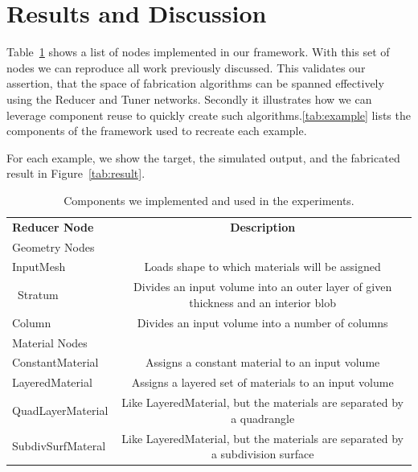 \documentclass[annual]{acmsiggraph}
\newcommand{\note}[1]{\marginpar{\LARGE $\spadesuit$}
			$\spadesuit$ {\bf #1} $\spadesuit$}
\begin{document}
%
%
%
%

\section{Results and Discussion}
Table~\ref{tab:built-in} shows a list of nodes implemented in our framework. With this set of nodes we can reproduce all work previously discussed. This validates our assertion, that the space of fabrication  algorithms can be spanned effectively using the Reducer and Tuner networks. Secondly it illustrates how we can leverage component reuse to quickly create such algorithms.\autoref{tab:example} lists the components of the framework used to recreate each example.

For each example, we show the target, the simulated output, and the fabricated result in Figure~\ref{tab:result}.


\begin{table}
\centering
\begin{tabular}{lc}
\hline 
\textbf{Reducer Node} & \textbf{Description} \\
Geometry Nodes &\\
\hline
InputMesh & Loads shape to which materials will be assigned\\\
Stratum & Divides an input volume into an outer layer of given thickness and an interior blob\\
Column & Divides an input volume into a number of columns\\
\hline
Material Nodes &\\
\hline
ConstantMaterial & Assigns a constant material to an input volume \\
LayeredMaterial &  Assigns a layered set of materials to an input volume \\
QuadLayerMaterial & Like LayeredMaterial, but the materials are separated by a quadrangle\\
SubdivSurfMateral & Like LayeredMaterial, but the materials are separated by a subdivision surface \\
\hline
\end{tabular}
\caption{Components we implemented and used in the experiments.}
\label{tab:built-in}
\end{table}
\end{document}
